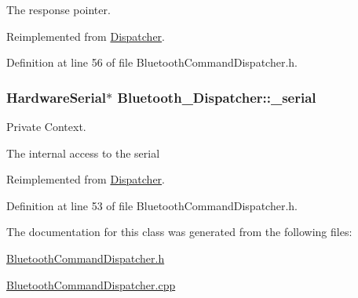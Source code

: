 \-The response pointer. 



\-Reimplemented from \hyperlink{class_dispatcher_a0e3c3d9054c4d8180aa56655bb6206a2}{\-Dispatcher}.



\-Definition at line 56 of file \-Bluetooth\-Command\-Dispatcher.\-h.

\hypertarget{class_bluetooth___dispatcher_a9b30fd1951f4e064a707ec75b941d18e}{
\subsubsection[{\-\_\-serial}]{\setlength{\rightskip}{0pt plus 5cm}\-Hardware\-Serial$\ast$ {\bf \-Bluetooth\-\_\-\-Dispatcher\-::\-\_\-serial}}}\label{class_bluetooth___dispatcher_a9b30fd1951f4e064a707ec75b941d18e}


\-Private \-Context. 

\-The internal access to the serial 

\-Reimplemented from \hyperlink{class_dispatcher_ab761cd7589c1d5fda8ff1b5ec4ce679f}{\-Dispatcher}.



\-Definition at line 53 of file \-Bluetooth\-Command\-Dispatcher.\-h.



\-The documentation for this class was generated from the following files\-:\begin{DoxyCompactItemize}
\item 
\hyperlink{_bluetooth_command_dispatcher_8h}{\-Bluetooth\-Command\-Dispatcher.\-h}\item 
\hyperlink{_bluetooth_command_dispatcher_8cpp}{\-Bluetooth\-Command\-Dispatcher.\-cpp}\end{DoxyCompactItemize}
